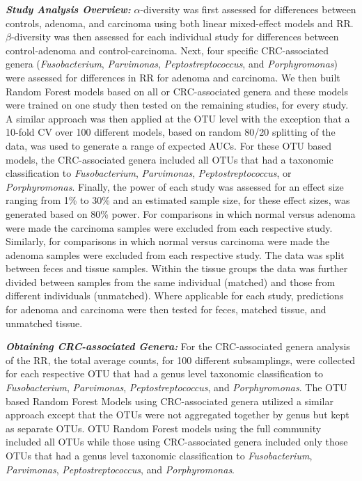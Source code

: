 \documentclass[12pt,]{article}
\begin{document}
\textbf{\emph{Study Analysis Overview:}} \(\alpha\)-diversity was first
assessed for differences between controls, adenoma, and carcinoma using
both linear mixed-effect models and RR. \(\beta\)-diversity was then
assessed for each individual study for differences between
control-adenoma and control-carcinoma. Next, four specific
CRC-associated genera (\emph{Fusobacterium}, \emph{Parvimonas},
\emph{Peptostreptococcus}, and \emph{Porphyromonas}) were assessed for
differences in RR for adenoma and carcinoma. We then built Random Forest
models based on all or CRC-associated genera and these models were
trained on one study then tested on the remaining studies, for every
study. A similar approach was then applied at the OTU level with the
exception that a 10-fold CV over 100 different models, based on random
80/20 splitting of the data, was used to generate a range of expected
AUCs. For these OTU based models, the CRC-associated genera included all
OTUs that had a taxonomic classification to \emph{Fusobacterium},
\emph{Parvimonas}, \emph{Peptostreptococcus}, or \emph{Porphyromonas}.
Finally, the power of each study was assessed for an effect size ranging
from 1\% to 30\% and an estimated sample size, for these effect sizes,
was generated based on 80\% power. For comparisons in which normal
versus adenoma were made the carcinoma samples were excluded from each
respective study. Similarly, for comparisons in which normal versus
carcinoma were made the adenoma samples were excluded from each
respective study. The data was split between feces and tissue samples.
Within the tissue groups the data was further divided between samples
from the same individual (matched) and those from different individuals
(unmatched). Where applicable for each study, predictions for adenoma
and carcinoma were then tested for feces, matched tissue, and unmatched
tissue.

\textbf{\emph{Obtaining CRC-associated Genera:}} For the CRC-associated
genera analysis of the RR, the total average counts, for 100 different
subsamplings, were collected for each respective OTU that had a genus
level taxonomic classification to \emph{Fusobacterium},
\emph{Parvimonas}, \emph{Peptostreptococcus}, and \emph{Porphyromonas}.
The OTU based Random Forest Models using CRC-associated genera utilized
a similar approach except that the OTUs were not aggregated together by
genus but kept as separate OTUs. OTU Random Forest models using the full
community included all OTUs while those using CRC-associated genera
included only those OTUs that had a genus level taxonomic classification
to \emph{Fusobacterium}, \emph{Parvimonas}, \emph{Peptostreptococcus},
and \emph{Porphyromonas}.
\end{document}
